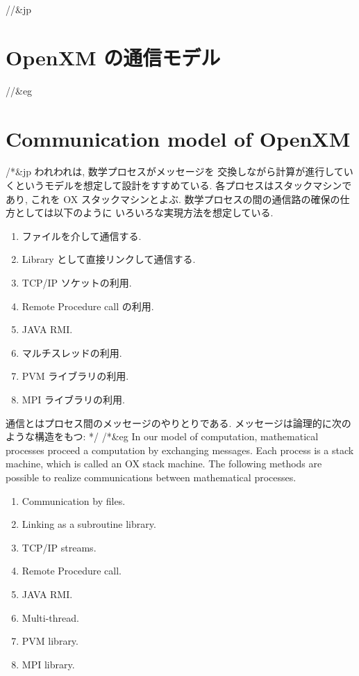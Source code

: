 //&jp \section{ OpenXM の通信モデル}
//&eg \section{ Communication model of OpenXM}

/*&jp
われわれは, 数学プロセスがメッセージを
交換しながら計算が進行していくというモデルを想定して設計をすすめている.
各プロセスはスタックマシンであり, これを OX スタックマシンとよぶ.
数学プロセスの間の通信路の確保の仕方としては以下のように
いろいろな実現方法を想定している.
\begin{enumerate}
\item ファイルを介して通信する.
\item Library として直接リンクして通信する.
\item TCP/IP ソケットの利用.
\item Remote Procedure call の利用.
\item JAVA RMI.
\item マルチスレッドの利用.
\item PVM ライブラリの利用.
\item MPI ライブラリの利用.
\end{enumerate}

通信とはプロセス間のメッセージのやりとりである.
メッセージは論理的に次のような構造をもつ: 
*/
/*&eg
In our model of computation, mathematical processes proceed 
a computation by exchanging messages. Each process is a stack machine,
which is called an OX stack machine.
The following methods are possible to realize communications between
mathematical processes.
\begin{enumerate}
\item Communication by files.
\item Linking as a subroutine library.
\item TCP/IP streams.
\item Remote Procedure call.
\item JAVA RMI.
\item Multi-thread.
\item PVM library.
\item MPI library.
\end{enumerate}


